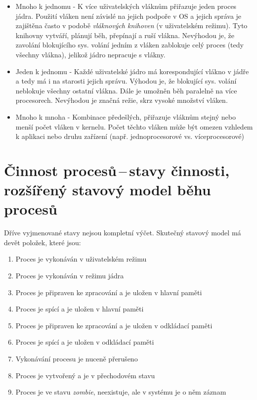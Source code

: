 \begin{itemize}
    \item Mnoho k jednomu - K více uživatelských vláknům přiřazuje jeden proces jádra. Použití vláken není závislé na jejich podpoře v OS a jejich správa je zajištěna často v podobě \textit{vláknových knihoven} (v uživatelském režimu). Tyto knihovny vytváří, plánují běh, přepínají a ruší vlákna. Nevýhodou je, že zavolání blokujícího sys. volání jedním z vláken zablokuje celý proces (tedy všechny vlákna), jelikož jádro nepracuje s vlákny.  
    \item Jeden k jednomu - Každé uživatelské jádro má korespondující vlákno v jádře a tedy má i na starosti jejich správu. Výhodou je, že blokující sys. volání neblokuje všechny ostatní vlákna. Dále je umožněn běh paralelně na více procesorech. Nevýhodou je značná režie, skrz vysoké množství vláken.
    \item Mnoho k mnoha - Kombinace předešlých, přiřazuje vláknům stejný nebo menší počet vláken v kernelu. Počet těchto vláken může být omezen vzhledem k aplikaci nebo druhu zařízení (např. jednoprocesorové vs. víceprocesorové)
\end{itemize}

\newpage
\section{Činnost procesů\,--\,stavy činnosti, rozšířený stavový model běhu procesů}

Dříve vyjmenované stavy nejsou kompletní výčet. Skutečný stavový model má devět položek, které jsou:

\begin{enumerate}
    \item Proces je vykonáván v uživatelském režimu
    \item Proces je vykonáván v režimu jádra
    \item Proces je připraven ke zpracování a je uložen v hlavní paměti
    \item Proces je spící a je uložen v hlavní paměti
    \item Proces je připraven ke zpracování a je uložen v odkládací paměti
    \item Proces je spící a je uložen v odkládací paměti
    \item Vykonávání procesu je nuceně přerušeno
    \item Proces je vytvořený a je v přechodovém stavu
    \item Proces je ve stavu \textit{zombie}, neexistuje, ale v systému je o něm záznam 
\end{enumerate}

